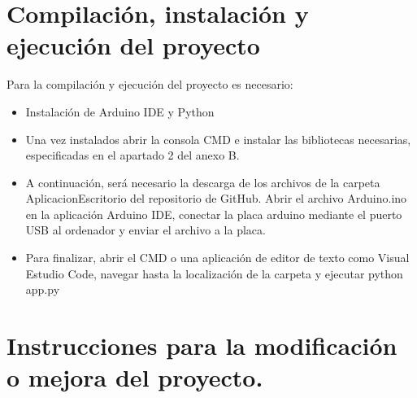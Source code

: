 \section{Compilación, instalación y ejecución del proyecto}
Para la compilación y ejecución del proyecto es necesario: 
\begin{itemize}
    \item Instalación de Arduino IDE y Python
    \item Una vez instalados abrir la consola CMD e instalar las bibliotecas necesarias, especificadas en el apartado 2 del anexo B. 
    \item A continuación, será necesario la descarga de los archivos de la carpeta AplicacionEscritorio del repositorio de GitHub. Abrir el archivo Arduino.ino en la aplicación Arduino IDE, conectar la placa arduino mediante el puerto USB al ordenador y enviar el archivo a la placa. 
    \item Para finalizar, abrir el CMD o una aplicación de editor de texto como Visual Estudio Code, navegar hasta la localización de la carpeta y ejecutar python app.py 
\end{itemize}
\section{Instrucciones para la modificación o mejora del proyecto.}
